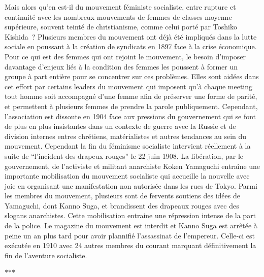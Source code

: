 \documentclass[11pt,a4paper]{article}
\newcommand{\partbreak}{\par\begin{center}\color{muted}$\ast$\quad$\ast$\quad$\ast$\end{center}\par}
\begin{document}
Mais alors qu’en est-il du mouvement féministe socialiste, entre rupture et continuité avec les nombreux mouvements de femmes de classes moyenne supérieure, souvent teinté de christianisme, comme celui porté par Toshiko Kishida~? Plusieurs membres du mouvement ont déjà été impliqués dans la lutte sociale en poussant à la création de syndicats en 1897 face à la crise économique. Pour ce qui est des femmes qui ont rejoint le mouvement, le besoin d’imposer davantage d’enjeux liés à la condition des femmes les poussent à former un groupe à part entière pour se concentrer sur ces problèmes. Elles sont aidées dans cet effort par certains leaders du mouvement qui imposent qu’à chaque meeting tout homme soit accompagné d’une femme afin de préserver une forme de parité, et permettent à plusieurs femmes de prendre la parole publiquement. Cependant, l’association est dissoute en 1904 face aux pressions du gouvernement qui se font de plus en plus insistantes dans un contexte de guerre avec la Russie et de division internes entres chrétiens, matérialistes et autres tendances au sein du mouvement. Cependant la fin du féminisme socialiste intervient réellement à la suite de “l’incident des drapeux rouges” le 22 juin 1908. La libération, par le gouvernement, de l’activiste et militant anarchiste Koken Yamaguchi entraîne une importante mobilisation du mouvement socialiste qui accueille la nouvelle avec joie en organisant une manifestation non autorisée dans les rues de Tokyo. Parmi les membres du mouvement, plusieurs sont de fervents soutiens des idées de Yamaguchi, dont Kanno Suga, et brandissent des drapeaux rouges avec des slogans anarchistes. Cette mobilisation entraine une répression intense de la part de la police. Le magazine du mouvement est interdit et Kanno Suga est arrêtée à peine un an plus tard pour avoir plannifié l’assassinat de l’empereur. Celle-ci est exécutée en 1910 avec 24 autres membres du courant marquant définitivement la fin de l’aventure socialiste.

\partbreak
\end{document}
